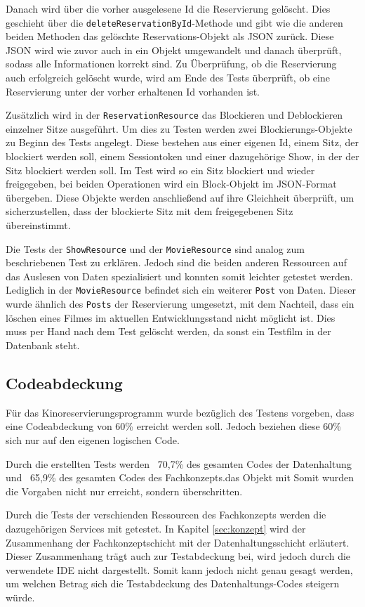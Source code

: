 Danach wird über die vorher ausgelesene Id die Reservierung gelöscht. Dies geschieht über die \texttt{deleteReservationById}-Methode und gibt wie die anderen beiden Methoden das gelöschte Reservations-Objekt als \acs{JSON} zurück.
Diese \acs{JSON} wird wie zuvor auch in ein Objekt umgewandelt und danach überprüft, sodass alle Informationen korrekt sind. 
Zu Überprüfung, ob die Reservierung auch erfolgreich gelöscht wurde, wird am Ende des Tests überprüft, ob eine Reservierung unter der vorher erhaltenen Id vorhanden ist. 

Zusätzlich wird in der \texttt{ReservationResource} das Blockieren und Deblockieren einzelner Sitze ausgeführt. Um dies zu Testen werden zwei Blockierungs-Objekte zu Beginn des Tests angelegt.
Diese bestehen aus einer eigenen Id, einem Sitz, der blockiert werden soll, einem Sessiontoken und einer dazugehörige Show, in der der Sitz blockiert werden soll. 
Im Test wird so ein Sitz blockiert und wieder freigegeben, bei beiden Operationen wird ein Block-Objekt im \acs{JSON}-Format übergeben. 
Diese Objekte werden anschließend auf ihre Gleichheit überprüft, um sicherzustellen, dass der blockierte Sitz mit dem freigegebenen Sitz übereinstimmt.

Die Tests der \texttt{ShowResource} und der \texttt{MovieResource} sind analog zum beschriebenen Test zu erklären. 
Jedoch sind die beiden anderen Ressourcen auf das Auslesen von Daten spezialisiert und konnten somit leichter getestet werden. 
Lediglich in der \texttt{MovieResource} befindet sich ein weiterer \texttt{Post} von Daten. 
Dieser wurde ähnlich des \texttt{Posts} der Reservierung umgesetzt, mit dem Nachteil, dass ein löschen eines Filmes im aktuellen Entwicklungsstand nicht möglicht ist. Dies muss per Hand nach dem Test gelöscht werden, da sonst ein Testfilm in der Datenbank steht.

\subsection{Codeabdeckung} 

Für das Kinoreservierungsprogramm wurde bezüglich des Testens vorgeben, dass eine Codeabdeckung von 60\% erreicht werden soll.
Jedoch beziehen diese 60\% sich nur auf den eigenen logischen Code. 

Durch die erstellten Tests werden ~70,7\% des gesamten Codes der Datenhaltung und ~65,9\% des gesamten Codes des Fachkonzepts.das Objekt mit 
Somit wurden die Vorgaben nicht nur erreicht, sondern überschritten.

Durch die Tests der verschienden Ressourcen des Fachkonzepts werden die dazugehörigen Services mit getestet.
In Kapitel \vref{sec:konzept} wird der Zusammenhang der Fachkonzeptschicht mit der Datenhaltungsschicht erläutert. 
Dieser Zusammenhang trägt auch zur Testabdeckung bei, wird jedoch durch die verwendete \acs{IDE} nicht dargestellt.
Somit kann jedoch nicht genau gesagt werden, um welchen Betrag sich die Testabdeckung des Datenhaltungs-Codes steigern würde.